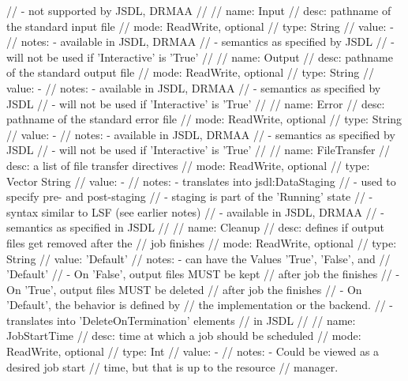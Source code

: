 \begin{myspec}
{{      //          - not supported by JSDL, DRMAA
      // 
      //   name:  Input
      //   desc:  pathname of the standard input file
      //   mode:  ReadWrite, optional
      //   type:  String
      //   value: -
      //   notes: - available in JSDL, DRMAA
      //          - semantics as specified by JSDL
      //          - will not be used if 'Interactive' is 'True'
      // 
      //   name:  Output
      //   desc:  pathname of the standard output file
      //   mode:  ReadWrite, optional
      //   type:  String
      //   value: -
      //   notes: - available in JSDL, DRMAA
      //          - semantics as specified by JSDL
      //          - will not be used if 'Interactive' is 'True'
      // 
      //   name:  Error
      //   desc:  pathname of the standard error file
      //   mode:  ReadWrite, optional
      //   type:  String
      //   value: -
      //   notes: - available in JSDL, DRMAA
      //          - semantics as specified by JSDL
      //          - will not be used if 'Interactive' is 'True'
      // 
      //   name:  FileTransfer
      //   desc:  a list of file transfer directives
      //   mode:  ReadWrite, optional
      //   type:  Vector String
      //   value: -
      //   notes: - translates into jsdl:DataStaging
      //          - used to specify pre- and post-staging
      //          - staging is part of the 'Running' state
      //          - syntax similar to LSF (see earlier notes)
      //          - available in JSDL, DRMAA
      //          - semantics as specified in JSDL 
      // 
      //   name:  Cleanup
      //   desc:  defines if output files get removed after the 
      //          job finishes
      //   mode:  ReadWrite, optional
      //   type:  String
      //   value: 'Default'
      //   notes: - can have the Values 'True', 'False', and 
      //            'Default'
      //          - On 'False', output files MUST be kept 
      //            after job the finishes
      //          - On 'True', output files MUST be deleted
      //            after job the finishes
      //          - On 'Default', the behavior is defined by
      //            the implementation or the backend.
      //          - translates into 'DeleteOnTermination' elements
      //            in JSDL
      // 
      //   name:  JobStartTime
      //   desc:  time at which a job should be scheduled
      //   mode:  ReadWrite, optional
      //   type:  Int
      //   value: -
      //   notes: - Could be viewed as a desired job start 
      //            time, but that is up to the resource 
      //            manager. 
}}
\end{myspec}

